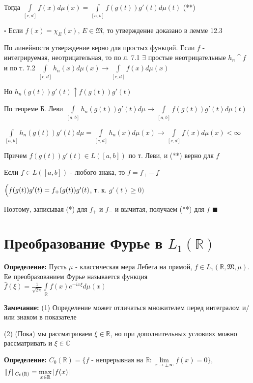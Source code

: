 \documentclass[a4paper]{report}
\newcommand*{\hm}[1]{#1\nobreak\discretionary{}%
            {\hbox{$\mathsurround=0pt #1$}}{}}
\begin{document}
Тогда $\displaystyle\int\limits_{[c,d]}f(x)d\mu(x)=\displaystyle\int\limits_{[a,b]}f(g(t))g'(t)d\mu(t)$ (**)

\noindent $\square$ Если $f(x)=\chi_E(x)$, $E\in\mathfrak M$, то утверждение доказано в лемме 12.3

По линейности утверждение верно для простых функций. Если $f$ - интегрируемая, неотрицательная, то по л. 7.1 $\exists$ простые неотрицательные $h_n\uparrow f$ и по т. 7.2 $\displaystyle\int\limits_{[c,d]}h_n(x)d\mu(x)\to\displaystyle\int\limits_{[c,d]}f(x)d\mu(x)$

Но $h_n(g(t))g'(t)\uparrow f(g(t))g'(t)$

По теореме Б. Леви $\displaystyle\int\limits_{[a,b]}h_n(g(t))g'(t)d\mu\to\displaystyle\int\limits_{[a,b]}f(g(t))g'(t)d\mu(t)$

$\displaystyle\int\limits_{[a,b]}h_n(g(t))g'(t)d\mu=\displaystyle\int\limits_{[c,d]}h_n(x)d\mu(x)\to\displaystyle\int\limits_{[c,d]}f(x)d\mu(x)<\infty$

Причем $f(g(t))g'(t)\in L([a,b])$ по т. Леви, и (**) верно для $f$

Если $f\in L([a,b])$ - любого знака, то $f=f_+-f_-$ 

$\Bigl(f(g(t))g'(t)=f_+(g(t))g'(t)$, т. к. $g'(t)\ge0\Bigr)$

Поэтому, записывая (*) для $f_+$ и $f_-$ и вычитая, получаем (**) для $f$ $\blacksquare$






\chapter{Преобразование Фурье в $L_1(\mathbb R)$}

\noindent\textbf{Определение:} Пусть $\mu$ - классическая мера Лебега на прямой, $f\in L_1(\mathbb R,\mathfrak M,\mu)$. Ее преобразованием Фурье называется функция $\hat f(\xi)=\displaystyle\frac1{\sqrt{2\pi}}\displaystyle\int\limits_{\mathbb R}f(x)e^{-ix\xi}d\mu(x)$
\bigskip

\noindent\textbf{Замечание:} (1) Определение может отличаться множителем перед интегралом и/или знаком в показателе

(2) (Пока) мы рассматриваем $\xi\in\mathbb R$, но при дополнительных условиях можно рассматривать и $\xi\in\mathbb C$
\bigskip

\noindent\textbf{Определение:} $C_0(\mathbb R)=\{f$ - непрерывная на $\mathbb R\colon\lim\limits_{x\to\pm\infty}f(x)=0\}$, $\|f\|_{C_0(\mathbb R)}\hm=\max\limits_{x\in\mathbb R}|f(x)|$
\bigskip
\end{document}
